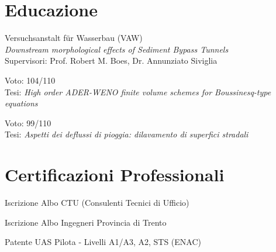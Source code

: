 
\section{Educazione}

Versuchsanstalt für Wasserbau (VAW) \\
\textit{Downstream morphological effects of Sediment Bypass Tunnels} \\
Supervisori: Prof. Robert M. Boes, Dr. Annunziato Siviglia
\sectionsep

Voto: 104/110 \\
Tesi: \textit{High order ADER-WENO finite volume schemes for Boussinesq-type equations}
\sectionsep

Voto: 99/110 \\
Tesi: \textit{Aspetti dei deflussi di pioggia: dilavamento di superfici stradali}
\sectionsep

\section{Certificazioni Professionali}

 Iscrizione Albo CTU (Consulenti Tecnici di Ufficio)
\sectionsep

 Iscrizione Albo Ingegneri Provincia di Trento
\sectionsep

 Patente UAS Pilota - Livelli A1/A3, A2, STS (ENAC)
\sectionsep
